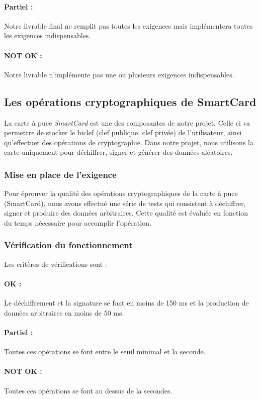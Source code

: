 \documentclass[a4paper,11pt,french]{article}
\begin{document}
\paragraph{Partiel : } Notre livrable final ne remplit pas toutes les
exigences mais implémentera toutes les exigences indispensables.
\paragraph{NOT OK : } Notre livrable n'implémente pas une ou plusieurs
exigences indispensables.

\subsection{Les opérations cryptographiques de SmartCard}
	La carte à puce \emph{SmartCard} est une des composantes de notre
projet. Celle ci va permettre de stocker le biclef (clef publique, clef
privée) de l'utilisateur, ainsi qu'effectuer des opérations de cryptographie.
Dans notre projet, nous utilisons la carte uniquement pour déchiffrer,
signer et générer des données aléatoires.
\subsubsection{Mise en place de l'exigence}
	Pour éprouver la qualité des opérations cryptographiques de la carte
à puce (SmartCard), nous avons effectué une série de tests qui consistent à
déchiffrer, signer et produire des données arbitraires. Cette qualité est
évaluée en fonction du temps nécessaire pour accomplir l'opération.

\subsubsection{Vérification du fonctionnement}
	Les critères de vérifications sont :
\paragraph{OK : } Le déchiffrement et la signature se font en moins
de 150 ms et la production de données arbitraires en moins de 50 ms.
\paragraph{Partiel : } Toutes ces opérations se font entre le seuil minimal
et la seconde.
\paragraph{NOT OK : } Toutes ces opérations se font au dessus de la secondes.
\end{document}
